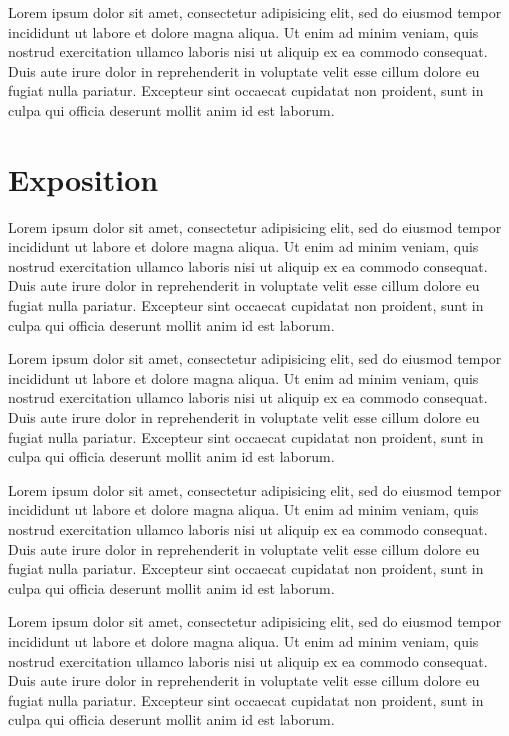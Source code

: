 \documentclass[conference]{acmsiggraph}
\begin{document}
Lorem ipsum dolor sit amet, consectetur adipisicing elit, sed do
eiusmod tempor incididunt ut labore et dolore magna aliqua. Ut enim ad
minim veniam, quis nostrud exercitation ullamco laboris nisi ut
aliquip ex ea commodo consequat. Duis aute irure dolor in
reprehenderit in voluptate velit esse cillum dolore eu fugiat nulla
pariatur. Excepteur sint occaecat cupidatat non proident, sunt in
culpa qui officia deserunt mollit anim id est laborum.

\section{Exposition}

Lorem ipsum dolor sit amet, consectetur adipisicing elit, sed do
eiusmod tempor incididunt ut labore et dolore magna aliqua. Ut enim ad
minim veniam, quis nostrud exercitation ullamco laboris nisi ut
aliquip ex ea commodo consequat. Duis aute irure dolor in
reprehenderit in voluptate velit esse cillum dolore eu fugiat nulla
pariatur. Excepteur sint occaecat cupidatat non proident, sunt in
culpa qui officia deserunt mollit anim id est laborum.

Lorem ipsum dolor sit amet, consectetur adipisicing elit, sed do
eiusmod tempor incididunt ut labore et dolore magna aliqua. Ut enim ad
minim veniam, quis nostrud exercitation ullamco laboris nisi ut
aliquip ex ea commodo consequat. Duis aute irure dolor in
reprehenderit in voluptate velit esse cillum dolore eu fugiat nulla
pariatur. Excepteur sint occaecat cupidatat non proident, sunt in
culpa qui officia deserunt mollit anim id est laborum.

Lorem ipsum dolor sit amet, consectetur adipisicing elit, sed do
eiusmod tempor incididunt ut labore et dolore magna aliqua. Ut enim ad
minim veniam, quis nostrud exercitation ullamco laboris nisi ut
aliquip ex ea commodo consequat. Duis aute irure dolor in
reprehenderit in voluptate velit esse cillum dolore eu fugiat nulla
pariatur. Excepteur sint occaecat cupidatat non proident, sunt in
culpa qui officia deserunt mollit anim id est laborum.

Lorem ipsum dolor sit amet, consectetur adipisicing elit, sed do
eiusmod tempor incididunt ut labore et dolore magna aliqua. Ut enim ad
minim veniam, quis nostrud exercitation ullamco laboris nisi ut
aliquip ex ea commodo consequat. Duis aute irure dolor in
reprehenderit in voluptate velit esse cillum dolore eu fugiat nulla
pariatur. Excepteur sint occaecat cupidatat non proident, sunt in
culpa qui officia deserunt mollit anim id est laborum.
\end{document}
